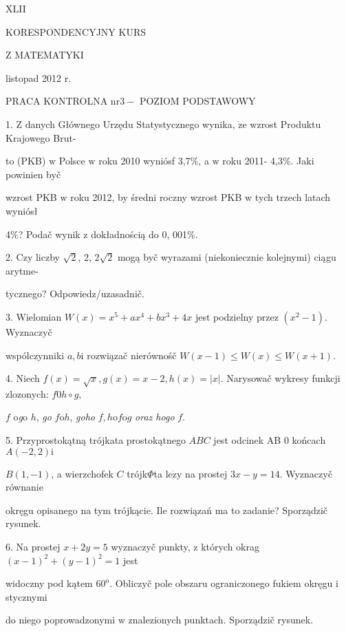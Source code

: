 \documentclass[a4paper,12pt]{article}
\begin{document}
XLII

KORESPONDENCYJNY KURS

Z MATEMATYKI

listopad 2012 r.

PRACA KONTROLNA $\mathrm{n}\mathrm{r} 3-$ POZIOM PODSTAWOWY

1. $\mathrm{Z}$ danych Głównego Urzędu Statystycznego wynika, $\dot{\mathrm{z}}\mathrm{e}$ wzrost Produktu Krajowego Brut-

to (PKB) $\mathrm{w}$ Polsce $\mathrm{w}$ roku 2010 wyniósf 3,7\%, a $\mathrm{w}$ roku 2011- 4,3\%. Jaki powinien byč

wzrost PKB $\mathrm{w}$ roku 2012, by średni roczny wzrost PKB $\mathrm{w}$ tych trzech latach wyniósł

4\%? Podač wynik $\mathrm{z}$ dokładnością do 0, 001\%.

2. Czy liczby $\sqrt{2}$, 2, $2\sqrt{2}$ mogą byč wyrazami (niekoniecznie kolejnymi) ciągu arytme-

tycznego? Odpowiedz/uzasadnič.

3. Wielomian $W(x) = x^{5}+ax^{4}+bx^{3}+4x$ jest podzielny przez $(x^{2}-1)$. Wyznaczyč

wspólczynniki $a, b\mathrm{i}$ rozwiązač nierównośč $W(x-1)\leq W(x)\leq W(x+1).$

4. Niech $f(x)=\sqrt{x}, g(x)=x-2, h(x)=|x|$. Narysowač wykresy funkcji zlozonych: $f0h\circ g,$

$f$ o{\it g}o $h$, {\it go} $f\mathrm{o}h$, {\it goho} $f, h\mathrm{o}f\mathrm{o}g$ {\it oraz hogo} $f.$

5. Przyprostokątną trójkata prostokątnego $ABC$ jest odcinek AB $0$ końcach $A(-2,2) \mathrm{i}$

$B(1,-1)$, a wierzchofek $C$ trójk$\Phi$ta $\mathrm{l}\mathrm{e}\dot{\mathrm{z}}\mathrm{y}$ na prostej $3x-y= 14$. Wyznaczyč równanie

okręgu opisanego na tym trójkącie. Ile rozwiązań ma to zadanie? Sporządzič rysunek.

6. Na prostej $x+2y=5$ wyznaczyč punkty, $\mathrm{z}$ których okrag $(x-1)^{2}+(y-1)^{2}=1$ jest

widoczny pod kątem $60^{\mathrm{o}}$. Obliczyč pole obszaru ograniczonego fukiem okręgu $\mathrm{i}$ stycznymi

do niego poprowadzonymi $\mathrm{w}$ znalezionych punktach. Sporządzič rysunek.
\end{document}
